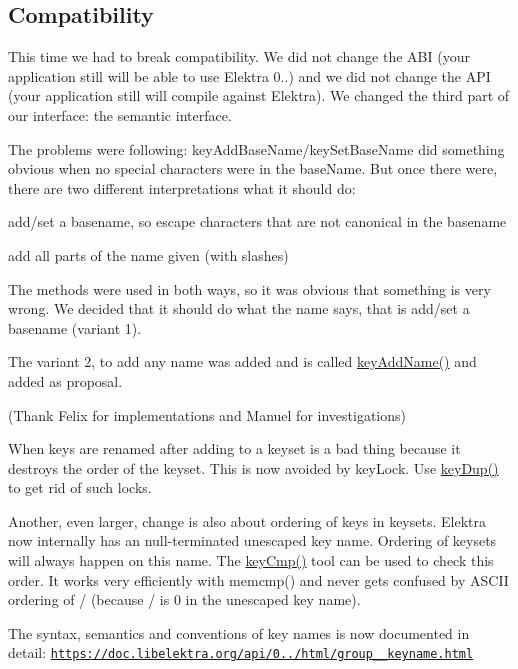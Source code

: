 \subsection*{Compatibility}

This time we had to break compatibility. We did not change the A\+BI (your application still will be able to use Elektra 0..) and we did not change the A\+PI (your application still will compile against Elektra). We changed the third part of our interface\+: the semantic interface.

The problems were following\+: key\+Add\+Base\+Name/key\+Set\+Base\+Name did something obvious when no special characters were in the base\+Name. But once there were, there are two different interpretations what it should do\+:


\begin{DoxyEnumerate}
\item add/set a basename, so escape characters that are not canonical in the basename
\item add all parts of the name given (with slashes)
\end{DoxyEnumerate}

The methods were used in both ways, so it was obvious that something is very wrong. We decided that it should do what the name says, that is add/set a basename (variant 1).

The variant 2, to add any name was added and is called \hyperlink{group__keyname_gaa70593a2c772c4b7bc33423b9b10a270}{key\+Add\+Name()} and added as proposal.

(Thank Felix for implementations and Manuel for investigations)

When keys are renamed after adding to a keyset is a bad thing because it destroys the order of the keyset. This is now avoided by key\+Lock. Use \hyperlink{group__key_gae6ec6a60cc4b8c1463fa08623d056ce3}{key\+Dup()} to get rid of such locks.

Another, even larger, change is also about ordering of keys in keysets. Elektra now internally has an null-\/terminated unescaped key name. Ordering of keysets will always happen on this name. The {\ttfamily \hyperlink{group__keytest_gaf6e66e12fe04d535a5d1c8218ced803e}{key\+Cmp()}} tool can be used to check this order. It works very efficiently with {\ttfamily memcmp()} and never gets confused by A\+S\+C\+II ordering of / (because / is 0 in the unescaped key name).

The syntax, semantics and conventions of key names is now documented in detail\+: \href{https://doc.libelektra.org/api/0.8.8/html/group__keyname.html}{\tt https\+://doc.\+libelektra.\+org/api/0../html/group\+\_\+\+\_\+keyname.\+html}

